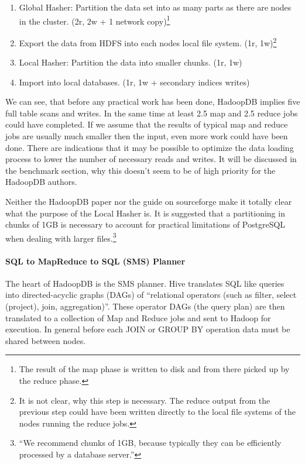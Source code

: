 \documentclass[12pt,a4paper]{scrartcl}		%
\begin{document}
\begin{enumerate}
\item Global Hasher: Partition the data set into as many parts as there are nodes in the cluster. (2r, 2w + 1 network copy)\footnote{The result of the map phase is written to disk and from there picked up by the reduce phase.}
\item Export the data from HDFS into each nodes local file system. (1r, 1w)\footnote{It is not clear, why this step is necessary. The reduce output from the previous step could have been written directly to the local file systems of the nodes running the reduce jobs.}
\item Local Hasher: Partition the data into smaller chunks. (1r, 1w)
\item Import into local databases. (1r, 1w + secondary indices writes)
\end{enumerate}

We can see, that before any practical work has been done, HadoopDB implies five full table scans and writes. In the same time at least 2.5 map and 2.5 reduce jobs could have completed. If we assume that the results of typical map and reduce jobs are usually much smaller then the input, even more work could have been done. There are indications that it may be possible to optimize the data loading process to lower the number of necessary reads and writes. It will be discussed in the benchmark section, why this doesn't seem to be of high priority for the HadoopDB authors.

Neither the HadoopDB paper nor the guide on sourceforge make it totally clear what the purpose of the Local Hasher is. It is suggested that a partitioning in chunks of 1GB is necessary to account for practical limitations of PostgreSQL when dealing with larger files.\footnote{``We recommend chunks of 1GB, because typically they can be efficiently processed by a database server.''}

\paragraph{SQL to MapReduce to SQL (SMS) Planner}
The heart of HadoopDB is the SMS planner. Hive translates SQL like queries into directed-acyclic graphs (DAGs) of ``relational operators (such as filter, select (project), join, aggregation)''. These operator DAGs (the query plan) are then translated to a collection of Map and Reduce jobs and sent to Hadoop for execution. In general before each JOIN or GROUP BY operation data must be shared between nodes. 
\end{document}
